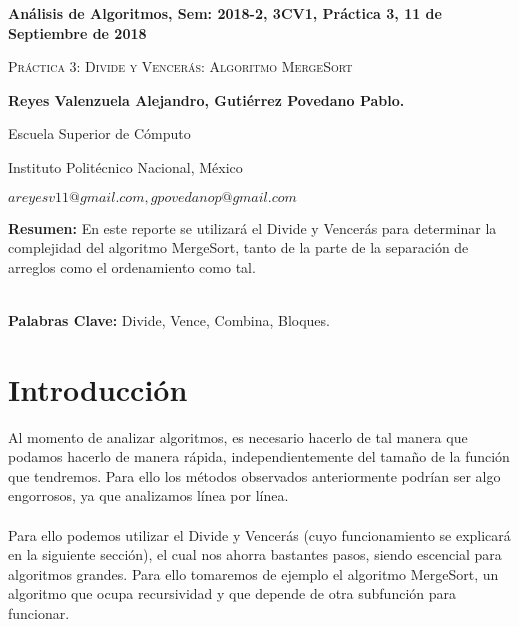 \documentclass[12pt,twoside]{article}
\date{}
\begin{document}
\centerline{\bf An\'alisis de Algoritmos, Sem: 2018-2, 3CV1, Pr\'actica 3, 11 de Septiembre de 2018}
\centerline{}
\centerline{}
\begin{center}
\Large{\textsc{Pr\'actica 3: Divide y Vencer\'as: Algoritmo MergeSort}}
\end{center}
\centerline{}
\centerline{\bf {Reyes Valenzuela Alejandro, Guti\'errez Povedano Pablo.}}
\centerline{}
\centerline{Escuela Superior de C\'omputo}
\centerline{Instituto Polit\'ecnico Nacional, M\'exico}
\centerline{$areyesv11@gmail.com, gpovedanop@gmail.com$}
\newtheorem{Theorem}{\quad Theorem}[section]
\newtheorem{Definition}[Theorem]{\quad Definition}
\newtheorem{Corollary}[Theorem]{\quad Corollary}
\newtheorem{Lemma}[Theorem]{\quad Lemma}
\newtheorem{Example}[Theorem]{\quad Example}
\bigskip
\textbf{Resumen:} En este reporte se utilizar\'a el Divide y Vencer\'as para determinar la complejidad del algoritmo MergeSort, tanto de la parte de la separaci\'on de arreglos como el ordenamiento como tal.\\\\
\centerline{{\bf Palabras Clave:} Divide, Vence, Combina, Bloques.}
\section{Introducci\'on}
Al momento de analizar algoritmos, es necesario hacerlo de tal manera que podamos hacerlo de manera r\'apida, independientemente del tamaño de la funci\'on que tendremos. Para ello los m\'etodos observados anteriormente podr\'ian ser algo engorrosos, ya que analizamos l\'inea por l\'inea. \\\\
Para ello podemos utilizar el Divide y Vencer\'as (cuyo funcionamiento se explicar\'a en la siguiente secci\'on), el cual nos ahorra bastantes pasos, siendo escencial para algoritmos grandes. Para ello tomaremos de ejemplo el algoritmo MergeSort, un algoritmo que ocupa recursividad y que depende de otra subfunci\'on para funcionar.\\\\
\end{document}
